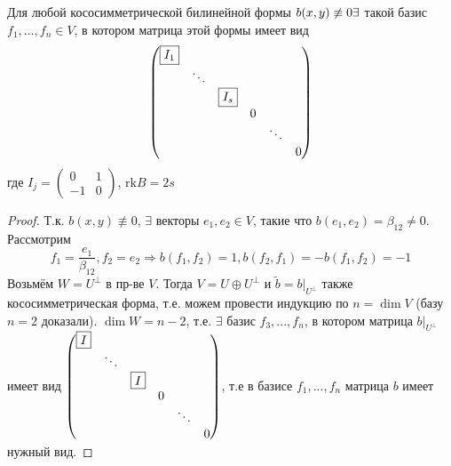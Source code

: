 \begin{theorem}
    Для любой кососимметрической билинейной формы $b(x,y) \not \equiv 0 \\ \exists$ такой базис $f_1,...,f_n \in V$, в котором матрица этой формы имеет вид
    $$\begin{pmatrix}
    \text{\fbox{$I_1$}}\\
    \null & \ddots\\
    \null & \null & \text{\fbox{$I_s$}}\\
    \null & \null & \null & 0\\
    \null & \null & \null & \null & \ddots\\
    \null & \null & \null & \null & \null & 0
    \end{pmatrix}$$ 
    где $I_j = \begin{pmatrix} 0&1 \\ -1&0 \end{pmatrix}$, $\text{rk} B = 2s$
\end{theorem}
\begin{proof}
    Т.к. $b(x,y) \not \equiv 0$, $\exists$ векторы $e_1, e_2 \in V$, такие что $b(e_1, e_2) = \beta_{12} \neq 0$. Рассмотрим
    $$f_1 = \frac{e_1}{\beta_{12}}, f_2 = e_2 \Rightarrow b(f_1,f_2) = 1, b(f_2,f_1) = -b(f_1,f_2) = -1$$
    Возьмём $W = U^{\perp}$ в пр-ве $V$. Тогда $V = U \oplus U^{\perp}$ и $\tilde{b} = b|_{U^{\perp}}$ также кососимметрическая форма, т.е. можем провести индукцию по $n = \dim V$ (базу $n = 2$ доказали). $\dim W = n-2$, т.е. $\exists$ базис $f_3,...,f_n$, в котором матрица $b|_{U^{\perp}}$ имеет вид $\begin{pmatrix}
    \text{\fbox{$I$}}\\
    \null & \ddots\\
    \null & \null & \text{\fbox{$I$}}\\
    \null & \null & \null & 0\\
    \null & \null & \null & \null & \ddots\\
    \null & \null & \null & \null & \null & 0
    \end{pmatrix}$, т.е в базисе $f_1,...,f_n$ матрица $b$ имеет нужный вид.
\end{proof}